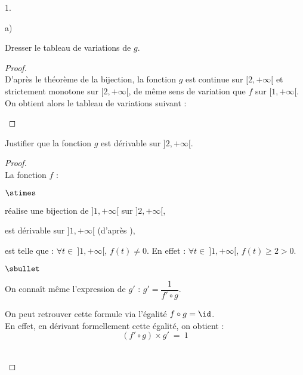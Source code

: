 \documentclass[11pt]{article}%
\begin{document}
\begin{noliste}{1.}
  \setlength{\itemsep}{4mm}
  \setcounter{enumi}{2}
\item
  \begin{noliste}{a)}
    \setlength{\itemsep}{2mm}
  \item Dresser le tableau de variations de $g$.
    \begin{proof}~\\
      D'après le théorème de la bijection, la fonction $g$ est
      continue sur $[2,+\infty[$ et strictement monotone sur
      $[2,+\infty[$, de même sens de variation que $f$ sur
      $[1,+\infty[$.\\
      On obtient alors le tableau de variations suivant :\\[-.2cm]
      \begin{center}
      \end{center}
    \end{proof}
    
  \item Justifier que la fonction $g$ est dérivable sur $]2,+\infty[$.
    \begin{proof}~\\
      La fonction $f$ :
      \begin{noliste}{$\stimes$}
      \item réalise une bijection de $]1,+\infty[$ sur $]2,+\infty[$,
        
      \item est dérivable sur $]1,+\infty[$ (d'après ),
        
      \item est telle que : $\forall t \in \ ]1,+\infty[$, $f(t) \neq
        0$. En effet : $\forall t \in \ ]1,+\infty[$, $f(t) \geq 2 > 0$.
      \end{noliste}
      \conc{On en déduit que $g$ est dérivable sur $]2,+\infty[$.}
      \begin{remark}
        \begin{noliste}{$\sbullet$}
        \item On connaît même l'expression de $g'$ : $g' =
          \dfrac{1}{f' \circ g}$.
          
        \item On peut retrouver cette formule via l'égalité $f \circ g
          = \id$.\\
          En effet, en dérivant formellement cette égalité, on obtient
          :
          \[
            (f' \circ g) \times g' \ = \ 1
          \]
        \end{noliste}
      \end{remark}~\\[-1.4cm]
    \end{proof}



\end{noliste}
\end{noliste}
\end{document}
